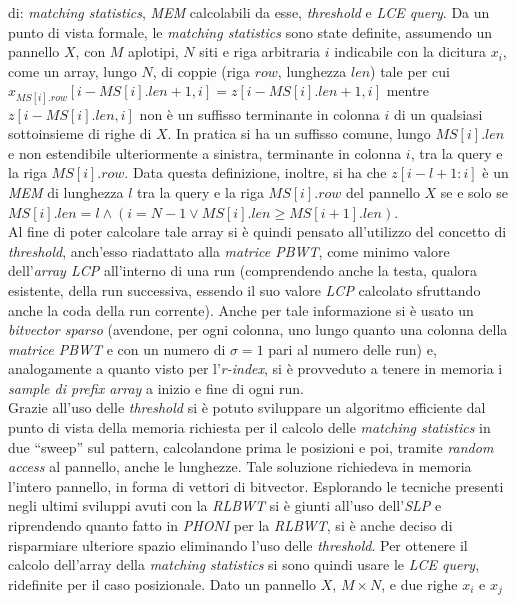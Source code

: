 \documentclass[a4paper,11pt, oneside,italian]{article}
\begin{document}
di: \textit{matching statistics}, \textit{MEM} 
calcolabili da esse, \textit{threshold} e \textit{LCE query}. Da un punto
di vista formale, le \textit{matching statistics}
sono state definite, assumendo un pannello $X$, con $M$ aplotipi, $N$ siti e
riga arbitraria $i$ indicabile con la dicitura $x_i$, come un array, lungo $N$,
di 
coppie (riga $row$, lunghezza $len$) tale per cui
$x_{MS[i].row}[i-MS[i].len+1,i]=z[i-MS[i].len+1,i]$ mentre $z[i-MS[i].len,i]$
non è un suffisso terminante in colonna $i$ di un qualsiasi sottoinsieme di
righe di $X$. In pratica si ha un suffisso comune, lungo $MS[i].len$ e non
estendibile ulteriormente a sinistra, terminante in
colonna $i$, tra la query e la riga $MS[i].row$. Data questa definizione,
inoltre, si ha che $z[i-l+1:i]$ 
è un \textit{MEM} di lunghezza $l$ tra la query e la riga $MS[i].row$ del
pannello $X$ se e solo se  $MS[i].len=l\land(i=N-1\lor MS[i].len\geq
MS[i+1].len)$.\\ 
Al fine di poter calcolare tale array si è quindi pensato all'utilizzo del
concetto di \textit{threshold}, anch'esso riadattato alla \textit{matrice PBWT},
come minimo valore dell'\textit{array LCP} all'interno di una run (comprendendo
anche la testa, qualora esistente, della run successiva, essendo il suo valore
\textit{LCP} calcolato sfruttando anche la coda della run corrente). Anche per
tale informazione si è usato un \textit{bitvector sparso} (avendone, per ogni
colonna, uno lungo quanto una colonna della \textit{matrice PBWT} e con un
numero di $\sigma=1$ pari al numero delle run) e, analogamente a
quanto visto per l'\textit{r-index}, si è provveduto a 
tenere in memoria i \textit{sample di prefix array} a inizio e fine di ogni
run.\\ 
Grazie all'uso delle \textit{threshold} si è potuto sviluppare un algoritmo
efficiente dal punto di vista della memoria richiesta per il calcolo delle
\textit{matching statistics} in due ``sweep'' sul pattern, calcolandone prima le
posizioni e 
poi, tramite \textit{random access} al pannello, anche le
lunghezze. Tale soluzione richiedeva in memoria
l'intero pannello, in forma di vettori di
bitvector. Esplorando le tecniche presenti negli ultimi sviluppi avuti con la
\textit{RLBWT} si è giunti all'uso 
dell'\textit{SLP} e riprendendo quanto fatto in \textit{PHONI} per
la \textit{RLBWT}, si è anche deciso di risparmiare ulteriore spazio eliminando
l'uso delle \textit{threshold}. Per ottenere il calcolo dell'array della
\textit{matching 
  statistics} si sono quindi usare le \textit{LCE query}, ridefinite per il
caso posizionale. Dato un pannello $X$, $M\times N$, e due righe $x_i$ e $x_j$
\end{document}

